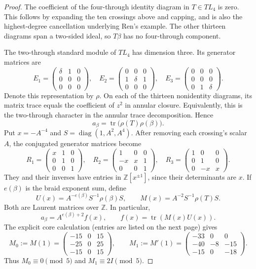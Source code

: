 \documentclass[11pt]{article}
\newcommand{\Z}{\mathbb Z}
\newcommand{\tr}{\operatorname{tr}}
\newcommand{\diag}{\operatorname{diag}}
\begin{document}
\begin{proof}
The coefficient of the four-through identity diagram in $T\in TL_4$ is zero. This follows by expanding the ten crossings above and capping, and is also the highest-degree cancellation underlying Ren's example. The other thirteen diagrams span a two-sided ideal, so $T\beta$ has no four-through component.

The two-through standard module of $TL_4$ has dimension three. Its generator matrices are
\[
 E_1=\begin{pmatrix}\delta&1&0\\0&0&0\\0&0&0\end{pmatrix},\quad
 E_2=\begin{pmatrix}0&0&0\\1&\delta&1\\0&0&0\end{pmatrix},\quad
 E_3=\begin{pmatrix}0&0&0\\0&0&0\\0&1&\delta\end{pmatrix}.
\]
Denote this representation by $\rho$. On each of the thirteen nonidentity diagrams, its matrix trace equals the coefficient of $z^2$ in annular closure. Equivalently, this is the two-through character in the annular trace decomposition. Hence
\[
 a_\beta=\tr\bigl(\rho(T)\rho(\beta)\bigr).
\]
\newpage
Put $x=-A^{-4}$ and $S=\diag(1,A^2,A^4)$. After removing each crossing's scalar $A$, the conjugated generator matrices become
\[
 R_1=\begin{pmatrix}x&1&0\\0&1&0\\0&0&1\end{pmatrix},\quad
 R_2=\begin{pmatrix}1&0&0\\-x&x&1\\0&0&1\end{pmatrix},\quad
 R_3=\begin{pmatrix}1&0&0\\0&1&0\\0&-x&x\end{pmatrix}.
\]
They and their inverses have entries in $\Z[x^{\pm1}]$, since their determinants are $x$. If $e(\beta)$ is the braid exponent sum, define
\[
 U(x)=A^{-e(\beta)}S^{-1}\rho(\beta)S,\qquad
 M(x)=A^{-2}S^{-1}\rho(T)S.
\]
Both are Laurent matrices over $\Z$. In particular,
\[
 a_\beta=A^{e(\beta)+2}f(x),\qquad f(x)=\tr(M(x)U(x)).
\]
The explicit core calculation (entries are listed on the next page) gives
\[
 M_0:=M(1)=
 \begin{pmatrix}-15&0&15\\-25&0&25\\-15&0&15\end{pmatrix},\qquad
 M_1:=M'(1)=
 \begin{pmatrix}-33&0&0\\-40&-8&-15\\-15&0&-18\end{pmatrix}.
\]
Thus $M_0\equiv0\pmod5$ and $M_1\equiv2I\pmod5$.


\end{proof}
\end{document}
